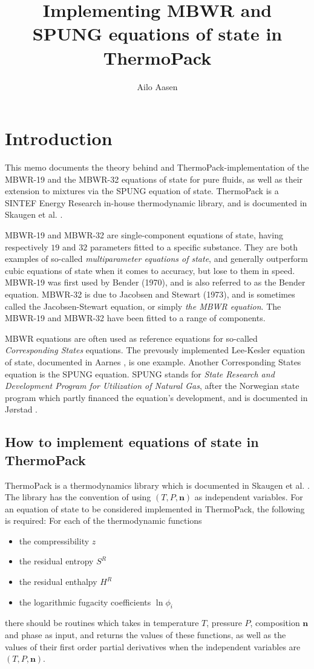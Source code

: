 \documentclass[internal,english]{sintefmemo2012}
\title{Implementing MBWR and SPUNG equations of state in ThermoPack}
\author{Ailo Aasen}
\newcommand{\mbn}[0]{\mathbf n}
\numberwithin{equation}{section}
\begin{document}
\frontmatter
\tableofcontents

\section{Introduction}
This memo documents the theory behind and ThermoPack-implementation of
the MBWR-19 and the MBWR-32 equations of state for pure fluids, as
well as their extension to mixtures via the SPUNG equation of
state. ThermoPack is a SINTEF Energy Research in-house thermodynamic library, and is
documented in Skaugen et al. \cite{ThermoPackDoc13}.

MBWR-19 and MBWR-32 are single-component equations of
state, having respectively $19$ and $32$ parameters fitted
to a specific substance. They are both examples of so-called
\textit{multiparameter equations of state}, and generally outperform
cubic equations of state when it comes to accuracy, but lose to them
in speed. MBWR-19 was first used by Bender (1970), and is also
referred to as the Bender equation. MBWR-32 is due to Jacobsen and
Stewart (1973), and is sometimes called the Jacobsen-Stewart equation,
or simply \textit{the MBWR equation}. The MBWR-19 and MBWR-32 have
been fitted to a range of components.

MBWR equations are often used as reference equations for so-called
\textit{Corresponding States} equations. The prevously implemented
Lee-Kesler equation of state, documented in Aarnes \cite{Aarnes13}, is
one example. Another Corresponding States equation is the SPUNG
equation. SPUNG stands for \textit{State Research and Development
  Program for Utilization of Natural Gas}, after the Norwegian state
program which partly financed the equation's development, and is
documented in J{\o}rstad \cite{Jorstad93}.

\subsection{How to implement equations of state in ThermoPack}
ThermoPack is a thermodynamics library which is documented in Skaugen et al.
\cite{ThermoPackDoc13}. The library has the convention of using $(T, P, \mbn)$ as
independent variables. For an equation of state to be considered implemented
in ThermoPack, the following is required: For each of the thermodynamic functions
\begin{itemize}
\item the compressibility $z$
\item the residual entropy $S^R$
\item the residual enthalpy $H^R$
\item the logarithmic fugacity coefficients $\ln \phi_i$
\end{itemize}
there should be routines which takes in temperature $T$, pressure $P$,
composition $\mbn$ and phase as input, and returns the values of these functions, as
well as the values of their first order partial derivatives when the independent
variables are $(T, P, \mbn)$.
\end{document}
